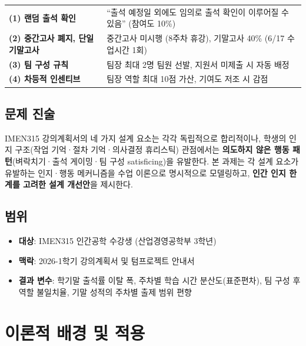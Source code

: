\documentclass[a4paper,11pt]{article}
\begin{document}
\begin{tcolorbox}[mybox=kored, title={본 과제가 분석하는 설계 요소}]
\begin{tabularx}{\linewidth}{@{}p{4.2cm}X@{}}
\textbf{(1) 랜덤 출석 확인} &
``출석 예정일 외에도 임의로 출석 확인이 이루어질 수 있음'' (참여도 10\%) \\[3pt]
\textbf{(2) 중간고사 폐지, 단일 기말고사} &
중간고사 미시행 (8주차 휴강), 기말고사 40\% (6/17 수업시간 1회) \\[3pt]
\textbf{(3) 팀 구성 규칙} &
팀장 최대 2명 팀원 선발, 지원서 미제출 시 자동 배정 \\[3pt]
\textbf{(4) 차등적 인센티브} &
팀장 역할 최대 10점 가산, 기여도 저조 시 감점 \\
\end{tabularx}
\end{tcolorbox}

\subsection{문제 진술}

\begin{tcolorbox}[mybox=darkred, title={핵심 문제}]
IMEN315 강의계획서의 네 가지 설계 요소는 각각 독립적으로 합리적이나, 학생의 인지
구조(작업 기억·절차 기억·의사결정 휴리스틱) 관점에서는 \textbf{의도하지 않은
행동 패턴}(벼락치기·출석 게이밍·팀 구성 satisficing)을 유발한다. 본 과제는
각 설계 요소가 유발하는 인지·행동 메커니즘을 수업 이론으로 명시적으로 모델링하고,
\textbf{인간 인지 한계를 고려한 설계 개선안}을 제시한다.
\end{tcolorbox}

\subsection{범위}

\begin{itemize}[leftmargin=1.5em, itemsep=1pt]
  \item \textbf{대상}: IMEN315 인간공학 수강생 (산업경영공학부 3학년)
  \item \textbf{맥락}: 2026-1학기 강의계획서 및 텀프로젝트 안내서
  \item \textbf{결과 변수}: 학기말 출석률 이탈 폭, 주차별 학습 시간 분산도(표준편차),
        팀 구성 후 역할 불일치율, 기말 성적의 주차별 출제 범위 편향
\end{itemize}

\section{이론적 배경 및 적용}
\end{document}
